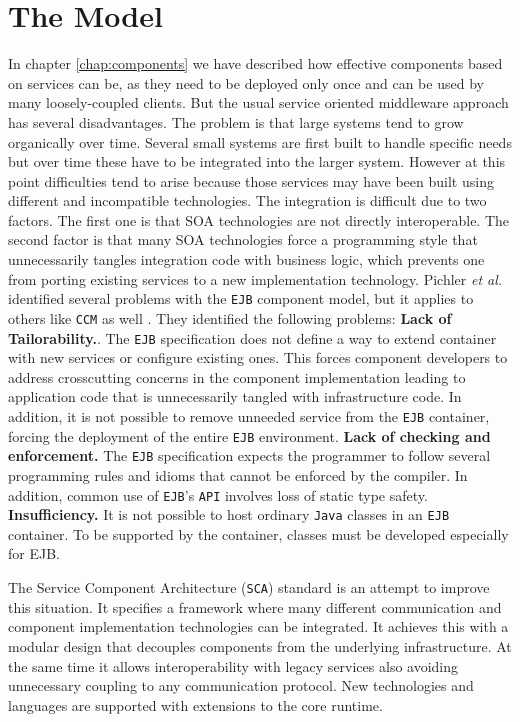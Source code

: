 \section{The Model}
In chapter \ref{chap:components} we have described how effective components based on services can be, as they need to be deployed only
once and can be used by many loosely-coupled clients. But the usual service oriented middleware approach has several disadvantages.
The problem is that large systems tend to grow organically over time. Several small systems are first built to handle specific needs
but over time these have to be integrated into the larger system. However at this point difficulties tend to arise because
those services may have been built using different and incompatible technologies. The integration is difficult due to two
factors. The first one is that SOA technologies are not directly interoperable. The second factor is that many SOA technologies
force a programming style that unnecessarily tangles integration code with business logic, which prevents one from porting
existing services to a new implementation technology. Pichler \emph{et al.} identified several problems with the \texttt{EJB}
component model, but it applies to others like \texttt{CCM} as well \cite{Pichler}. They identified the following problems:
\textbf{Lack of Tailorability.}. The \texttt{EJB} specification does not define a way to extend container with new services or configure
existing ones. This forces component developers to address crosscutting concerns in the component implementation leading to application
code that is unnecessarily tangled with infrastructure code. In addition, it is not possible to remove unneeded service from
the \texttt{EJB} container, forcing the deployment of the entire \texttt{EJB} environment. \textbf{Lack of checking and enforcement.} The \texttt{EJB}
specification expects the programmer to follow several programming rules and idioms that cannot be enforced by the compiler.
In addition, common use of \texttt{EJB}'s \texttt{API} involves loss of static type safety. \textbf{Insufficiency.} It is not possible to host
ordinary \texttt{Java} classes in an \texttt{EJB} container. To be supported by the container, classes must be developed especially for EJB.

The Service Component Architecture (\texttt{SCA}) standard is an attempt to improve this situation. It specifies a framework
where many different communication and component implementation technologies can be integrated. It achieves this
with a modular design that decouples components from the underlying infrastructure. At the same time it allows
interoperability with legacy services also avoiding unnecessary coupling to any communication protocol. New
technologies and languages are supported with extensions to the core runtime.

